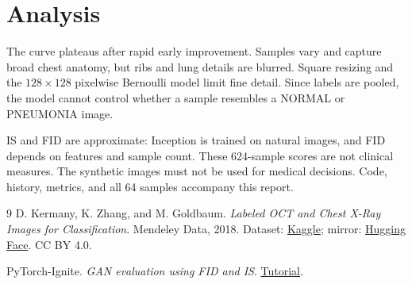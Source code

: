 \documentclass{article}
\begin{document}
\section{Analysis}
The curve plateaus after rapid early improvement. Samples vary and capture broad chest anatomy, but ribs and lung details are blurred. Square resizing and the $128\times128$ pixelwise Bernoulli model limit fine detail. Since labels are pooled, the model cannot control whether a sample resembles a NORMAL or PNEUMONIA image.

IS and FID are approximate: Inception is trained on natural images, and FID depends on features and sample count. These 624-sample scores are not clinical measures. The synthetic images must not be used for medical decisions. Code, history, metrics, and all 64 samples accompany this report.

\begin{thebibliography}{9}
\small
{}
D. Kermany, K. Zhang, and M. Goldbaum. \emph{Labeled OCT and Chest X-Ray Images for Classification}. Mendeley Data, 2018. Dataset: \href{https://www.kaggle.com/datasets/paultimothymooney/chest-xray-pneumonia}{Kaggle}; mirror: \href{https://huggingface.co/datasets/ahulikal/chest-xray-pneumonia-mirror}{Hugging Face}. CC BY 4.0.

PyTorch-Ignite. \emph{GAN evaluation using FID and IS}. \href{https://pytorch-ignite.ai/blog/gan-evaluation-with-fid-and-is/}{Tutorial}.
\end{thebibliography}
\end{document}

